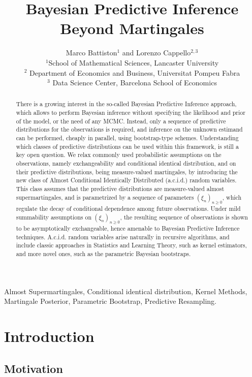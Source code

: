 \documentclass{article}
\title{Bayesian Predictive Inference Beyond Martingales}
\author{Marco Battiston$^{1}$ and Lorenzo Cappello$^{2,3}$\\
 		$^1$School of Mathematical Sciences, Lancaster University\\
	$^2$ Department of Economics and Business, Universitat Pompeu Fabra\\
$^3$ Data Science Center, Barcelona School of Economics}
\theoremstyle{definition}
\renewcommand{\&}{and}
\begin{document}
\def\spacingset#1{\renewcommand{\baselinestretch}%
	{#1}\small\normalsize} \spacingset{1}


	\maketitle
	
	\begin{abstract}
There is a growing interest in the so-called Bayesian Predictive Inference approach, which allows to perform Bayesian inference without specifying the likelihood and prior of the model, or the need of any MCMC. Instead, only a sequence of predictive distributions for the observations is required, and inference on the unknown estimand can be performed, cheaply in parallel, using bootstrap-type schemes. 
Understanding which classes of predictive distributions can be used within this framework, is still a key open question. We relax commonly used probabilistic assumptions on the observations, namely exchangeability and conditional identical distribution, and on their predictive distributions, being measure-valued martingales, by introducing the new class of Almost Conditional Identically Distributed (a.c.i.d.) random variables. This class assumes that the predictive distributions are measure-valued almost supermartingales, and is parametrized by a sequence of parameters $(\xi_{n})_{n\geq 0}$, which regulate the decay of conditional dependence among future observations. Under mild summability assumptions on $(\xi_{n})_{n\geq 0}$, the resulting sequence of observations is shown to be asymptotically exchangeable, hence amenable to Bayesian Predictive Inference 
techniques. A.c.i.d. random variables arise naturally in recursive algorithms, and include classic approaches in Statistics and Learning Theory, such as kernel estimators, and more novel ones, such as the parametric Bayesian bootstraps. 
	\end{abstract}

\begin{keywords}
Almost Supermartingales, Conditional identical distribution, Kernel Methods, Martingale Posterior, Parametric Bootstrap, Predictive Resampling.
\end{keywords}




\section{Introduction} \label{sec:intro}

\subsection{Motivation}
\end{document}
